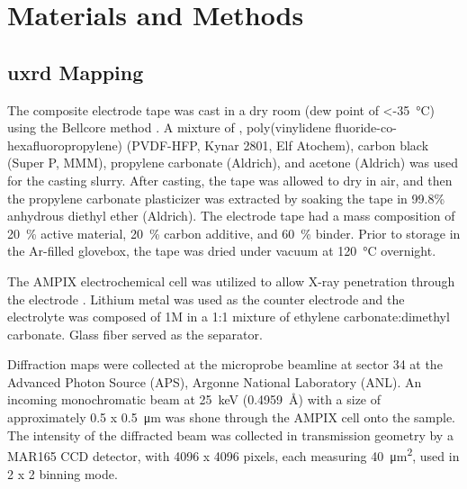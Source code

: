 \documentclass{article}
\begin{document}
\section*{Materials and Methods}

\subsection*{\gls{uxrd} Mapping}

The \nca{} composite electrode tape was cast in a dry room (dew point
of \SI{<-35}{\celsius}) using the Bellcore method \cite{warren1996}. A
mixture of \nca{}, poly(vinylidene fluoride-co-hexafluoropropylene)
(PVDF-HFP, Kynar 2801, Elf Atochem), carbon black (Super P, MMM),
propylene carbonate (Aldrich), and acetone (Aldrich) was used for the
casting slurry. After casting, the tape was allowed to dry in air, and
then the propylene carbonate plasticizer was extracted by soaking the
tape in 99.8\% anhydrous diethyl ether (Aldrich). The electrode tape
had a mass composition of \SI{20}{\percent} active material,
\SI{20}{\percent} carbon additive, and \SI{60}{\percent} binder. Prior
to storage in the Ar-filled glovebox, the tape was dried under vacuum
at \SI{120}{\celsius} overnight.

The AMPIX electrochemical cell was utilized to allow X-ray penetration
through the electrode \cite{borkiewicz2012}. Lithium metal was used as
the counter electrode and the electrolyte was composed of 1M
 in a 1:1 mixture of ethylene carbonate:dimethyl
carbonate. Glass fiber served as the separator.

Diffraction maps were collected at the microprobe beamline at sector
34 at the Advanced Photon Source (APS), Argonne National Laboratory
(ANL). An incoming monochromatic beam at \SI{25}{\kilo\electronvolt}
(\SI{0.4959}{\angstrom}) with a size of approximately \num{0.5} x
\SI{0.5}{\micro\meter} was shone through the AMPIX cell onto the
sample. The intensity of the diffracted beam was collected in
transmission geometry by a MAR165 CCD detector, with 4096 x 4096
pixels, each measuring \SI{40}{\square\micro\meter}, used in 2 x 2
binning mode.
\end{document}
